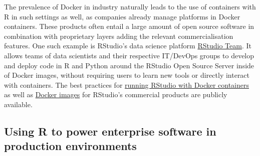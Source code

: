 The prevalence of Docker in industry naturally leads to the use of
containers with R in such settings as well, as companies already manage
platforms in Docker containers. These products often entail a large
amount of open source software in combination with proprietary layers
adding the relevant commercialisation features. One such example is
RStudio's data science platform
\href{https://rstudio.com/products/team/}{RStudio Team}. It allows teams
of data scientists and their respective IT/DevOps groups to develop and
deploy code in R and Python around the RStudio Open Source Server inside
of Docker images, without requiring users to learn new tools or directly
interact with containers. The best practices for
\href{https://support.rstudio.com/hc/en-us/articles/360021594513-Running-RStudio-with-Docker-containers}{running
RStudio with Docker containers} as well as
\href{https://github.com/rstudio/rstudio-docker-products}{Docker images}
for RStudio's commercial products are publicly available.

\hypertarget{using-r-to-power-enterprise-software-in-production-environments}{%
\subsection{Using R to power enterprise software in production
environments}\label{using-r-to-power-enterprise-software-in-production-environments}}

\label{enterprise}

